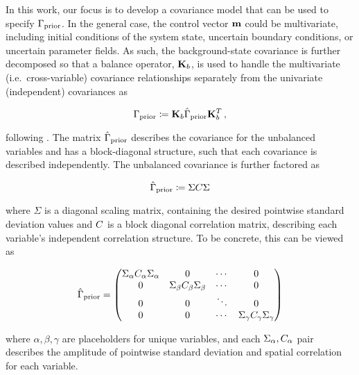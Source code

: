 In this work, our focus is to develop a covariance model that can be used to
specify $\Gamma_{\text{prior}}$.
In the general case, the control vector $\mathbf{m}$ could be multivariate,
including initial conditions of the system state, uncertain boundary
conditions, or uncertain parameter fields.
As such, the background-state covariance is
further decomposed so that a balance operator, $\mathbf{K}_{b}$, is used
to handle the multivariate (i.e.\ cross-variable) covariance relationships
separately from the univariate (independent) covariances as
\begin{linenomath*}\begin{equation*}
    \Gamma_{\text{prior}} \coloneqq \mathbf{K}_{b}\hat{\Gamma}_\text{prior}\mathbf{K}_{b}^T \,
    ,
\end{equation*}\end{linenomath*}
following .
The matrix $\hat{\Gamma}_\text{prior}$ describes the covariance for the unbalanced
variables and has a block-diagonal structure, such that each
covariance is described independently.
The unbalanced covariance is further factored as
\begin{linenomath*}\begin{equation*}
    \hat{\Gamma}_\text{prior} \coloneqq \Sigma C \Sigma
\end{equation*}\end{linenomath*}
where $\Sigma$ is a diagonal scaling matrix, containing the desired pointwise
standard deviation values and $C$ is a block diagonal correlation matrix,
describing each variable's independent correlation structure.
To be concrete, this can be viewed as
\begin{linenomath*}\begin{equation*}
    \hat{\Gamma}_\text{prior} =
    \begin{pmatrix}
        \Sigma_\alpha C_\alpha\Sigma_\alpha & 0 & \cdots & 0 \\
        0 & \Sigma_\beta C_\beta\Sigma_\beta & \cdots & 0 \\
        0 & 0 & \ddots & 0  \\
        0 & 0 & \cdots & \Sigma_\gamma C_\gamma\Sigma_\gamma \\
    \end{pmatrix}
\end{equation*}\end{linenomath*}
where $\alpha, \beta, \gamma$ are placeholders for unique variables, and each
$\Sigma_\alpha, C_\alpha$ pair describes the amplitude of pointwise standard deviation
and spatial correlation for each variable.

